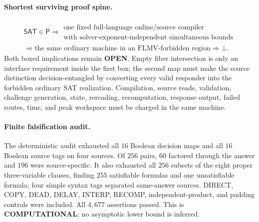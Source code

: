 \documentclass[11pt]{article}
\newcommand{\statusopen}{\textcolor{openstatus}{\textbf{OPEN}}}
\begin{document}
\paragraph{Shortest surviving proof spine.}
\[
\begin{gathered}
\mathsf{SAT}\in\mathsf P
\Longrightarrow
\boxed{\begin{array}{c}
\text{one fixed full-language online/source compiler}\\
\text{with solver-exponent-independent simultaneous bounds}
\end{array}}\\
\Longrightarrow
\boxed{\text{the same ordinary machine in an FLMV-forbidden region}}
\Longrightarrow\bot .
\end{gathered}
\]
Both boxed implications remain \statusopen.  Empty fiber intersection is only
an interface requirement inside the first box; the second map must make the
source distinction decision-entangled by converting every valid responder
into the forbidden ordinary SAT realization.  Compilation, source reads,
validation, challenge generation, state, rereading, recomputation, response
output, failed routes, time, and peak workspace must be charged in the same
machine.

\paragraph{Finite falsification audit.}
The deterministic audit exhausted all $16$ Boolean decision maps and all
$16$ Boolean source tags on four sources.  Of $256$ pairs, $60$ factored
through the answer and $196$ were source-specific.  It also exhausted all
$256$ subsets of the eight proper three-variable clauses, finding $255$
satisfiable formulas and one unsatisfiable formula; four simple syntax tags
separated same-answer sources.  DIRECT, COPY, DEAD, DELAY, INTERP, RECOMP,
independent-product, and padding controls were included.  All $4{,}677$
assertions passed.  This is \textbf{COMPUTATIONAL}; no asymptotic lower bound
is inferred.
\end{document}
